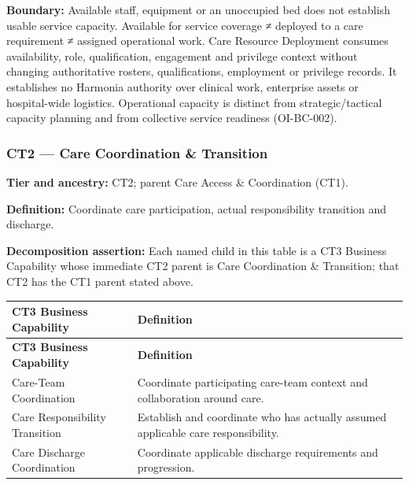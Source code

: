 \textbf{Boundary:} Available staff, equipment or an unoccupied bed does not establish usable service capacity. Available for service coverage ≠ deployed to a care requirement ≠ assigned operational work. Care Resource Deployment consumes availability, role, qualification, engagement and privilege context without changing authoritative rosters, qualifications, employment or privilege records. It establishes no Harmonia authority over clinical work, enterprise assets or hospital-wide logistics. Operational capacity is distinct from strategic/\allowbreak{}tactical capacity planning and from collective service readiness (OI-BC-002).

\label{rad:business:405}
\subsubsection*{CT2 — Care Coordination \& Transition}
\label{rad:business:407}

\textbf{Tier and ancestry:} CT2; parent Care Access \& Coordination (CT1).

\label{rad:business:409}

\textbf{Definition:} Coordinate care participation, actual responsibility transition and discharge.

\label{rad:business:411}

\textbf{Decomposition assertion:} Each named child in this table is a CT3 Business Capability whose immediate CT2 parent is Care Coordination \& Transition; that CT2 has the CT1 parent stated above.

\label{rad:business:413}
\begingroup\small\setlength{\TableWidth}{\dimexpr\linewidth-4\tabcolsep-3\arrayrulewidth\relax}
\begin{longtable}{|>{\raggedright\arraybackslash}p{0.35\TableWidth}|>{\raggedright\arraybackslash}p{0.65\TableWidth}|}
\hline\rowcolor{TableHead}\textbf{CT3 Business Capability} & \textbf{Definition}\\\hline\endfirsthead
\hline\rowcolor{TableHead}\textbf{CT3 Business Capability} & \textbf{Definition}\\\hline\endhead
\hline\endfoot
Care-Team Coordination & Coordinate participating care-team context and collaboration around care.\\\hline
Care Responsibility Transition & Establish and coordinate who has actually assumed applicable care responsibility.\\\hline
Care Discharge Coordination & Coordinate applicable discharge requirements and progression.\\\hline
\end{longtable}\endgroup
{}\label{rad:business:419}

